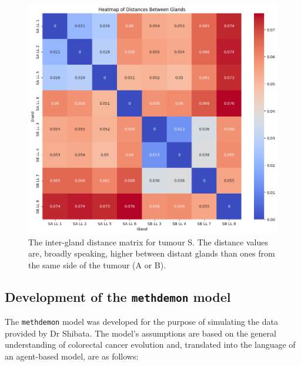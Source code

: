 \begin{figure}[h]
    \centering
    \includegraphics[width=\textwidth]{Chapter_5/figures/gland_dist_S.png}
    \caption{The inter-gland distance matrix for tumour S. The distance values
    are, broadly speaking, higher between distant glands than ones from the same
    side of the tumour (A or B).}
    \label{fig:gland_dist_S}
\end{figure}

\subsection{Development of the \texttt{methdemon} model}
The \texttt{methdemon} model was developed for the purpose of simulating the
data provided by Dr Shibata. The model's assumptions are based on the general
understanding of colorectal cancer evolution and, translated into the language
of an agent-based model, are as follows:

